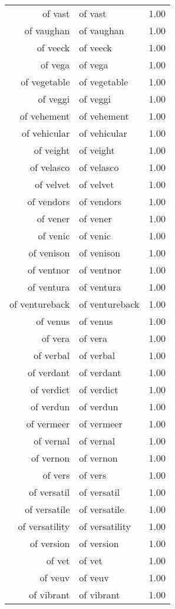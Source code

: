 \begin{table}[ht]
\begin{tabular}{rlr}
  of vast & of vast & 1.00 \\ 
  of vaughan & of vaughan & 1.00 \\ 
  of veeck & of veeck & 1.00 \\ 
  of vega & of vega & 1.00 \\ 
  of vegetable & of vegetable & 1.00 \\ 
  of veggi & of veggi & 1.00 \\ 
  of vehement & of vehement & 1.00 \\ 
  of vehicular & of vehicular & 1.00 \\ 
  of veight & of veight & 1.00 \\ 
  of velasco & of velasco & 1.00 \\ 
  of velvet & of velvet & 1.00 \\ 
  of vendors & of vendors & 1.00 \\ 
  of vener & of vener & 1.00 \\ 
  of venic & of venic & 1.00 \\ 
  of venison & of venison & 1.00 \\ 
  of ventnor & of ventnor & 1.00 \\ 
  of ventura & of ventura & 1.00 \\ 
  of ventureback & of ventureback & 1.00 \\ 
  of venus & of venus & 1.00 \\ 
  of vera & of vera & 1.00 \\ 
  of verbal & of verbal & 1.00 \\ 
  of verdant & of verdant & 1.00 \\ 
  of verdict & of verdict & 1.00 \\ 
  of verdun & of verdun & 1.00 \\ 
  of vermeer & of vermeer & 1.00 \\ 
  of vernal & of vernal & 1.00 \\ 
  of vernon & of vernon & 1.00 \\ 
  of vers & of vers & 1.00 \\ 
  of versatil & of versatil & 1.00 \\ 
  of versatile & of versatile & 1.00 \\ 
  of versatility & of versatility & 1.00 \\ 
  of version & of version & 1.00 \\ 
  of vet & of vet & 1.00 \\ 
  of veuv & of veuv & 1.00 \\ 
  of vibrant & of vibrant & 1.00 \\ 

\end{tabular}
\end{table}
